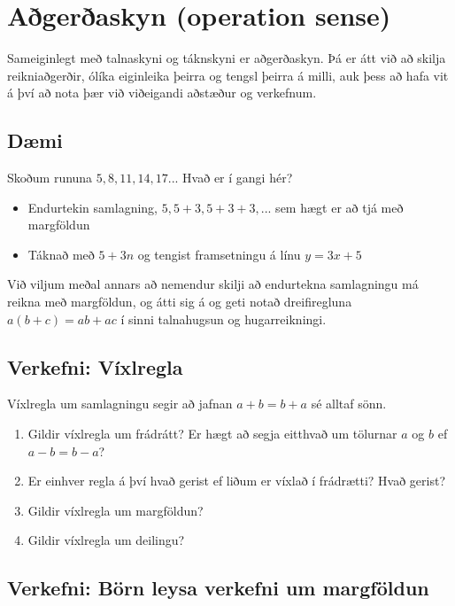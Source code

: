 \documentclass[
  icelandic,
]{book}
\providecommand{\tightlist}{%
  \setlength{\itemsep}{0pt}\setlength{\parskip}{0pt}}
\theoremstyle{definition}
\theoremstyle{definition}
\theoremstyle{definition}
\theoremstyle{definition}
\theoremstyle{remark}
\begin{document}
\section{Aðgerðaskyn (operation sense)}\label{adgerda-skyn}

Sameiginlegt með talnaskyni og táknskyni er aðgerðaskyn. Þá er átt við að skilja reikniaðgerðir, ólíka eiginleika þeirra og tengsl þeirra á milli, auk þess að hafa vit á því að nota þær við viðeigandi aðstæður og verkefnum.

\subsection{Dæmi}\label{daemi-adgerdaskyn}

Skoðum rununa \(5, 8, 11, 14, 17...\) Hvað er í gangi hér?

\begin{itemize}
\tightlist
\item
  Endurtekin samlagning, \(5, 5+3, 5+3+3, ...\) sem hægt er að tjá með margföldun
\item
  Táknað með \(5 + 3n\) og tengist framsetningu á línu \(y = 3x+5\)
\end{itemize}

Við viljum meðal annars að nemendur skilji að endurtekna samlagningu má reikna með margföldun, og átti sig á og geti notað dreifiregluna \(a(b+c)=ab+ac\) í sinni talnahugsun og hugarreikningi.

\subsection{Verkefni: Víxlregla}\label{verkefni-vixlregla}

Víxlregla um samlagningu segir að jafnan \(a+b = b+a\) sé alltaf sönn.

\begin{enumerate}
\def\labelenumi{\arabic{enumi}.}
\tightlist
\item
  Gildir víxlregla um frádrátt? Er hægt að segja eitthvað um tölurnar \(a\) og \(b\) ef \(a-b = b-a\)?
\item
  Er einhver regla á því hvað gerist ef liðum er víxlað í frádrætti? Hvað gerist?
\item
  Gildir víxlregla um margföldun?
\item
  Gildir víxlregla um deilingu?
\end{enumerate}

\subsection{Verkefni: Börn leysa verkefni um margföldun}\label{verkefni-myndband-talnaskyn}
\end{document}
